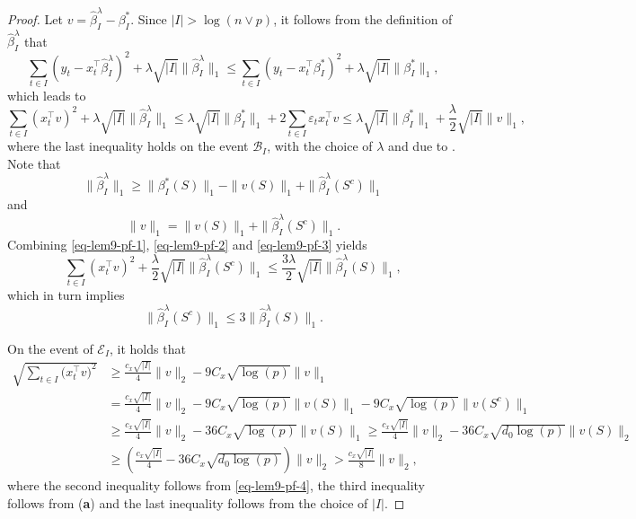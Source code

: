 \documentclass[twoside]{article}
\begin{document}
\begin{proof}
Let $v = \widehat{\beta}^{\lambda}_I - \beta^*_I$.  Since $|I| > \log(n \vee p)$, it follows from the definition of $\widehat{\beta}^{\lambda}_I$ that
	\[
		\sum_{t \in I} (y_t - x_t^{\top}\widehat{\beta}^{\lambda}_I)^2 + \lambda \sqrt{|I|}\|\widehat{\beta}^{\lambda}_I\|_1 \leq \sum_{t \in I} (y_t - x_t^{\top}\beta^*_I)^2 + \lambda \sqrt{|I|}\|\beta^*_I\|_1,
	\]
	which leads to
	\begin{equation}\label{eq-lem9-pf-1}
		\sum_{t \in I}(x_t^{\top}v)^2 + \lambda\sqrt{|I|}\|\widehat{\beta}^{\lambda}_I\|_1 \leq \lambda \sqrt{|I|}\|\beta^*_I\|_1 + 2 \sum_{t \in I} \varepsilon_t x_t^{\top}v \leq \lambda \sqrt{|I|}\|\beta^*_I\|_1 +  \frac{\lambda}{2}\sqrt{|I|}\|v\|_1,
	\end{equation}
	where the last inequality holds on the event $\mathcal{B}_I$, with the choice of $\lambda$ and due to .  Note that
	\begin{equation}\label{eq-lem9-pf-2}
		\|\widehat{\beta}^{\lambda}_I\|_1 \geq \|\beta^*_I(S)\|_1 - \|v(S)\|_1 + \|\widehat{\beta}^{\lambda}_I(S^c)\|_1
	\end{equation}
	and 
	\begin{equation}\label{eq-lem9-pf-3}
		\|v\|_1 = \|v(S)\|_1 + \|\widehat{\beta}^{\lambda}_I(S^c)\|_1.
	\end{equation}
	Combining \eqref{eq-lem9-pf-1}, \eqref{eq-lem9-pf-2} and \eqref{eq-lem9-pf-3} yields
	\begin{equation}\label{eq-lem9-pf-4}
		\sum_{t \in I}(x_t^{\top}v)^2 + \frac{\lambda}{2}\sqrt{|I|}\|\widehat{\beta}^{\lambda}_I(S^c)\|_1 \leq \frac{3\lambda}{2}\sqrt{|I|}\|\widehat{\beta}^{\lambda}_I(S)\|_1,
	\end{equation}
	which in turn implies
	\[
		\|\widehat{\beta}^{\lambda}_I(S^c)\|_1 \leq 3\|\widehat{\beta}^{\lambda}_I(S)\|_1.
	\]
	
On the event of $\mathcal{E}_I$, it holds that
	\begin{align}
		\sqrt{\sum_{t \in I} \bigl(x_t^{\top}v\bigr)^2} & \geq \frac{c_x\sqrt{|I|}}{4} \|v\|_2 - 9 C_x \sqrt{\log(p)}\|v\|_1 \nonumber \\
		& = \frac{c_x\sqrt{|I|}}{4} \|v\|_2 - 9 C_x \sqrt{\log(p)}\|v(S)\|_1 - 9 C_x \sqrt{\log(p)}\|v(S^c)\|_1 \nonumber \\
		& \geq \frac{c_x\sqrt{|I|}}{4} \|v\|_2 - 36 C_x \sqrt{\log(p)}\|v(S)\|_1 \geq  \frac{c_x\sqrt{|I|}}{4} \|v\|_2 - 36 C_x \sqrt{d_0 \log(p)}\|v(S)\|_2 \nonumber \\
		& \geq \left(\frac{c_x\sqrt{|I|}}{4} - 36 C_x \sqrt{d_0 \log(p)}\right) \|v\|_2 > \frac{c_x\sqrt{|I|}}{8} \|v\|_2, \label{eq-lem9-pf-5}
	\end{align}
	where the second inequality follows from \eqref{eq-lem9-pf-4}, the third inequality follows from (\textbf{a}) and the last inequality follows from the choice of $|I|$.
	

\end{proof}
\end{document}
